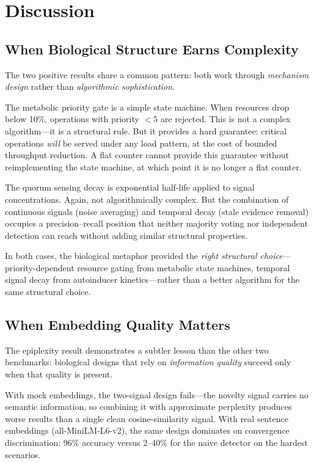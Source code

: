 \section{Discussion}\label{sec:discussion}

\subsection{When Biological Structure Earns Complexity}

The two positive results share a common pattern: both work through
\emph{mechanism design} rather than \emph{algorithmic sophistication}.

The metabolic priority gate is a simple state machine.  When resources
drop below 10\%, operations with priority $< 5$ are rejected.  This is
not a complex algorithm---it is a structural rule.  But it provides a
hard guarantee: critical operations \emph{will} be served under any
load pattern, at the cost of bounded throughput reduction.  A flat
counter cannot provide this guarantee without reimplementing the state
machine, at which point it is no longer a flat counter.

The quorum sensing decay is exponential half-life applied to signal
concentrations.  Again, not algorithmically complex.  But the
combination of continuous signals (noise averaging) and temporal decay
(stale evidence removal) occupies a precision--recall position that
neither majority voting nor independent detection can reach without
adding similar structural properties.

In both cases, the biological metaphor provided the \emph{right
structural choice}---priority-dependent resource gating from metabolic
state machines, temporal signal decay from autoinducer kinetics---rather
than a better algorithm for the same structural choice.

\subsection{When Embedding Quality Matters}

The epiplexity result demonstrates a subtler lesson than the other two
benchmarks: biological designs that rely on \emph{information quality}
succeed only when that quality is present.

With mock embeddings, the two-signal design fails---the novelty signal
carries no semantic information, so combining it with approximate
perplexity produces worse results than a single clean cosine-similarity
signal.  With real sentence embeddings (all-MiniLM-L6-v2), the same
design dominates on convergence discrimination: 96\% accuracy versus
2--40\% for the naive detector on the hardest scenarios.

